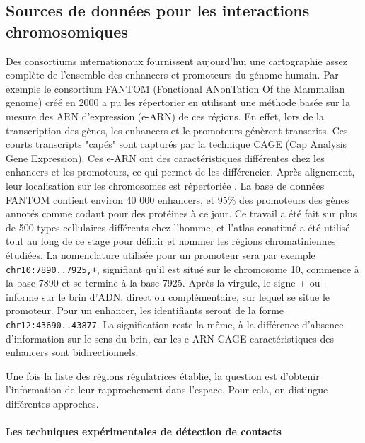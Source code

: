 \documentclass[french]{llncs}
\begin{document}
\subsection{Sources de données pour les interactions chromosomiques} \label{section:donnees}


Des consortiums internationaux fournissent aujourd'hui une cartographie assez complète de l'ensemble
des enhancers et promoteurs du génome humain. Par exemple le consortium FANTOM (Fonctional ANonTation Of the Mammalian genome) créé en 2000 a pu les répertorier en utilisant une méthode basée sur la mesure des ARN d'expression (e-ARN) de ces régions. En effet, lors de la transcription des gènes, les enhancers et le promoteurs génèrent transcrits. Ces courts transcripts "capés" sont capturés par la technique CAGE (Cap Analysis Gene Expression). Ces e-ARN ont des caractéristiques différentes chez les enhancers et les promoteurs, ce qui permet de les différencier. Après alignement, leur localisation sur les chromosomes est répertoriée \cite{the_fantom_consortium_atlas_2014} \cite{the_fantom_consortium_and_the_riken_pmi_and_clst_dgt_promoter-level_2014}. La base de données FANTOM contient environ 40 000 enhancers, et 95\% des promoteurs des gènes annotés comme codant pour des protéines à ce jour. Ce travail a été fait sur plus de 500 types cellulaires différents chez l'homme, et l'atlas constitué a été utilisé tout au long de ce stage pour définir et nommer les régions chromatiniennes étudiées. La nomenclature utilisée pour un promoteur sera par exemple \texttt{chr10:7890..7925,+}, signifiant qu'il est situé sur le chromosome 10, commence à la base 7890 et se termine à la base 7925. Après la virgule, le signe + ou - informe sur le brin d'ADN, direct ou complémentaire, sur lequel se situe le promoteur. Pour un enhancer, les identifiants seront de la forme \texttt{chr12:43690..43877}. La signification reste la même, à la différence d'absence d'information sur le sens du brin, car les e-ARN CAGE caractéristiques des enhancers sont bidirectionnels.

Une fois la liste des régions régulatrices établie, la question est d'obtenir l'information de leur rapprochement dans l'espace. Pour cela, on distingue différentes approches.

\paragraph{Les techniques expérimentales de détection de contacts}
\end{document}
